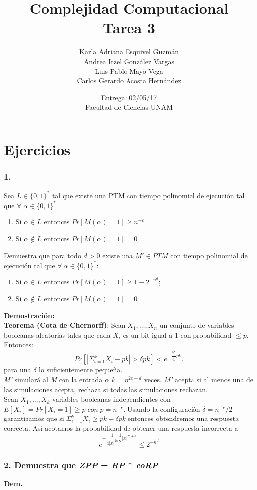 \documentclass[12pt]{article}
\title{Complejidad Computacional \\ Tarea 3}
\author{Karla Adriana Esquivel Guzmán \\ Andrea Itzel González Vargas\\ Luis Pablo Mayo Vega \\ Carlos Gerardo Acosta Hernández}
\date{Entrega: 02/05/17 \\ Facultad de Ciencias UNAM}
\begin{document}
\maketitle
\section*{Ejercicios}
\subsubsection*{1.}
Sea $L \in \{0,1\}^*$ tal que existe una PTM con tiempo polinomial de ejecución tal que $\forall \; \alpha \in \{0,1\}^*$

\begin{enumerate}[label=\alph*)]
\item Si $\alpha \in L$ entonces $Pr[M(\alpha) = 1] \geq n^{-c}$
\item Si $\alpha \notin L$ entonces $Pr[M(\alpha) = 1] = 0$
\end{enumerate}
Demuestra que para todo $d > 0$ existe una $M' \in PTM$ con tiempo polinomial de ejecución tal que $\forall \;\alpha \in \{0,1\}^*$:
\begin{enumerate}[label=\alph*)]
\item Si $\alpha \in L$ entonces $Pr[M(\alpha) = 1] \geq 1 - 2^{-n^d}$;
\item Si $\alpha \notin L$ entonces $Pr[M(\alpha) = 1] = 0$
\end{enumerate}
\textsf{\textbf{Demostración:}}\\
\textbf{Teorema (Cota de Chernorff)}: Sean $X_1, \dots, X_n$ un conjunto de variables booleanas aleatorias tales que cada $X_i$ es un bit igual a 1 con probabilidad $\leq p$. Entonces:
\[Pr[|\Sigma_{i=1}^k X_i - pk | > \delta pk] < e^{-{\dfrac{\delta^2}4}pk}.\]
para una $\delta$ lo suficientemente pequeña. \\
\textit{M'} simulará al \textit{M} con la entrada $\alpha$ $k=n^{2c+d}$ veces. \textit{M'} acepta si al menos una de las simulaciones acepta, rechaza si todas las simulaciones rechazan.\\
Sean $X_1, \dots, X_k$ variables booleanas independientes con $E[X_i] = Pr[X_i=1] \geq p \; con \; p=n^{-c}$. Usando la configuración $\delta = n ^{-c}/2$ garantizamos que si $\Sigma_{i=1}^k X_i \geq pk - \delta pk$ entonces obtendremos una respuesta correcta. Así acotamos la probabilidad de obtener una respuesta incorrecta a
\[ e^{-{\dfrac{1}{4|x|^{2c}}}\dfrac{1}{2}|x|^{2c+d}} \leq 2^{-n^d} \]

\subsubsection*{2. Demuestra que \textit{ZPP} = \textit{RP} $\cap$ \textit{coRP}}
\textbf{Dem.}\\
\end{document}
